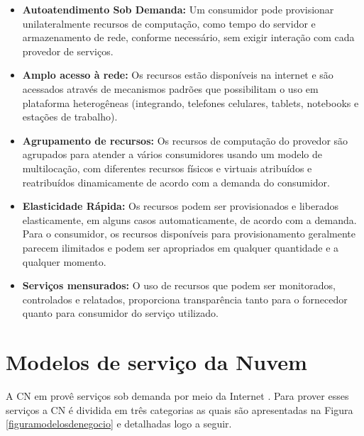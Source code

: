 \documentclass[tcc,capa]{texufpel}
\begin{document}
\begin{itemize}
    \item \textbf{Autoatendimento Sob Demanda:} Um consumidor pode provisionar unilateralmente recursos de computação, como tempo do servidor e armazenamento de rede, conforme necessário, sem exigir interação com cada provedor de serviços.
    \item \textbf{Amplo acesso à rede:} Os recursos estão disponíveis na internet e são acessados através de mecanismos padrões que possibilitam o uso em plataforma heterogêneas (integrando, telefones celulares, tablets, notebooks e estações de trabalho).
    \item \textbf{Agrupamento de recursos:} Os recursos de computação do provedor são agrupados para atender a vários consumidores usando um modelo de multilocação, com diferentes recursos físicos e virtuais atribuídos e reatribuídos dinamicamente de acordo com a demanda do consumidor.
    \item \textbf{Elasticidade Rápida:} Os recursos podem ser provisionados e liberados elasticamente, em alguns casos automaticamente, de acordo com a demanda. Para o consumidor, os recursos disponíveis para provisionamento geralmente parecem ilimitados e podem ser apropriados em qualquer quantidade e a qualquer momento.
    \item \textbf{Serviços mensurados:} O uso de recursos que podem ser monitorados, controlados e relatados, proporciona transparência tanto para o fornecedor quanto para consumidor do serviço utilizado.
\end{itemize}

\section{Modelos de serviço da Nuvem}

A CN em provê serviços sob demanda por meio da Internet \cite{chieu2009dynamic}. Para prover esses serviços a CN é dividida em três categorias as quais são apresentadas na Figura \ref{figuramodelosdenegocio} e detalhadas logo a seguir.

\newpage
\end{document}
